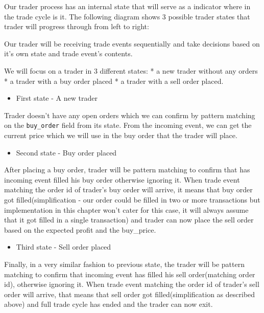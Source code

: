 \documentclass[
]{book}
\providecommand{\tightlist}{%
  \setlength{\itemsep}{0pt}\setlength{\parskip}{0pt}}
\begin{document}
Our trader process has an internal state that will serve as a indicator where in the trade cycle is it. The following diagram shows 3 possible trader states that trader will progress through from left to right:

Our trader will be receiving trade events sequentially and take decisions
based on it's own state and trade event's contents.

We will focus on a trader in 3 different states:
* a new trader without any orders
* a trader with a buy order placed
* a trader with a sell order placed.

\begin{itemize}
\tightlist
\item
  First state - A new trader
\end{itemize}

Trader doesn't have any open orders which we can confirm by pattern matching on the \texttt{buy\_order} field from its state. From the incoming event, we can get
the current price which we will use in the buy order that the trader will place.

\begin{itemize}
\tightlist
\item
  Second state - Buy order placed
\end{itemize}

After placing a buy order, trader will be pattern matching to confirm that
has incoming event filled his buy order otherwise ignoring it.
When trade event matching the order id of trader's buy order will arrive, it means that buy order got filled(simplification - our order could be filled in two or more transactions but implementation in this chapter won't cater for this case, it will always assume that it got filled in a single transaction) and trader can now place the sell order based on the expected profit and the buy\_price.

\begin{itemize}
\tightlist
\item
  Third state - Sell order placed
\end{itemize}

Finally, in a very similar fashion to previous state, the trader will be pattern matching to confirm that incoming event has filled his sell order(matching order id), otherwise ignoring it.
When trade event matching the order id of trader's sell order will arrive, that means that sell order got filled(simplification as described above) and full trade cycle has ended and the trader can now exit.
\end{document}
